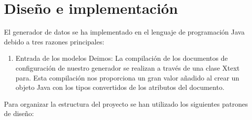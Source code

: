 \chapter{Diseño e implementación\label{05disenoTrabajo}}

El generador de datos se ha implementado en el lenguaje de programación Java debido a tres razones principales:

\begin{enumerate}
  \item Entrada de los modelos Deimos: La compilación de los documentos de configuración de nuestro generador se realizan a través de una clase Xtext para. Esta compilación nos proporciona un gran valor añadido al crear un objeto Java con los tipos convertidos de los atributos del documento.

  
\end{enumerate}

Para organizar la estructura del proyecto se han utilizado los siguientes patrones de diseño:

